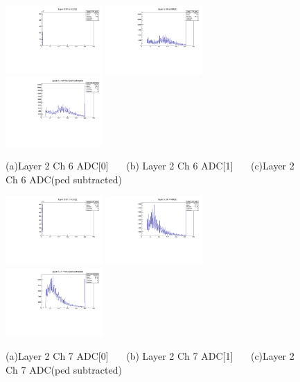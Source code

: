 \documentclass[a4paper,11pt]{article}
\theoremstyle{mytheor}
\begin{document}
\begin{figure}[H] 
\vspace*{-0.3cm} 
\includegraphics[width=0.33\textwidth,scale=0.5,trim=0 0 0 0,clip]{plotsdir/file0_test-Layer2_Ch6_adc0-1.pdf} 
\includegraphics[width=0.33\textwidth,scale=0.5,trim=0 0 0 0,clip]{plotsdir/file0_test-Layer2_Ch6_adc1-1.pdf} 
\includegraphics[width=0.33\textwidth,scale=0.5,trim=0 0 0 0,clip]{plotsdir/file0_test-Layer2_Ch6_adcPedsub-1.pdf} 
\caption{(a)Layer 2 Ch 6 ADC[0] ~~~(b) Layer 2 Ch 6 ADC[1] ~~~(c)Layer 2 Ch 6 ADC(ped subtracted) } 
\end{figure} 
\begin{figure}[H] 
\vspace*{-0.3cm} 
\includegraphics[width=0.33\textwidth,scale=0.5,trim=0 0 0 0,clip]{plotsdir/file0_test-Layer2_Ch7_adc0-1.pdf} 
\includegraphics[width=0.33\textwidth,scale=0.5,trim=0 0 0 0,clip]{plotsdir/file0_test-Layer2_Ch7_adc1-1.pdf} 
\includegraphics[width=0.33\textwidth,scale=0.5,trim=0 0 0 0,clip]{plotsdir/file0_test-Layer2_Ch7_adcPedsub-1.pdf} 
\caption{(a)Layer 2 Ch 7 ADC[0] ~~~(b) Layer 2 Ch 7 ADC[1] ~~~(c)Layer 2 Ch 7 ADC(ped subtracted) } 
\end{figure} 
\end{document}
